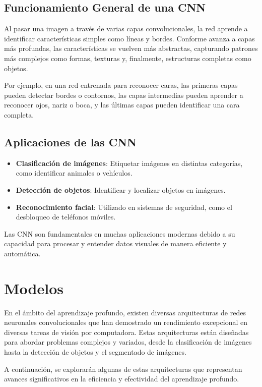 \subsection{Funcionamiento General de una CNN}\label{subsec:funcionamiento-general-de-una-cnn}
Al pasar una imagen a través de varias capas convolucionales, la red aprende a identificar características simples como
líneas y bordes.
Conforme avanza a capas más profundas, las características se vuelven más abstractas, capturando patrones más complejos
como formas, texturas y, finalmente, estructuras completas como objetos.


Por ejemplo, en una red entrenada para reconocer caras, las primeras capas pueden detectar bordes o contornos, las
capas intermedias pueden aprender a reconocer ojos, nariz o boca, y las últimas capas pueden identificar una cara
completa.

\subsection{Aplicaciones de las CNN}\label{subsec:aplicaciones-de-las-cnn}
\begin{itemize}
    \item \textbf{Clasificación de imágenes}: Etiquetar imágenes en distintas categorías, como identificar animales o
          vehículos.
    \item \textbf{Detección de objetos}: Identificar y localizar objetos en imágenes.
    \item \textbf{Reconocimiento facial}: Utilizado en sistemas de seguridad, como el desbloqueo de teléfonos móviles.
\end{itemize}

Las CNN son fundamentales en muchas aplicaciones modernas debido a su capacidad para procesar y entender datos visuales
de manera eficiente y automática.

\section{Modelos}\label{sec:modelos}
En el ámbito del aprendizaje profundo, existen diversas arquitecturas de redes neuronales convolucionales que han
demostrado un rendimiento excepcional en diversas tareas de visión por computadora.
Estas arquitecturas están diseñadas para abordar problemas complejos y variados, desde la clasificación de imágenes
hasta la detección de objetos y el segmentado de imágenes.


A continuación, se explorarán algunas de estas arquitecturas que representan avances significativos en la eficiencia y
efectividad del aprendizaje profundo.

